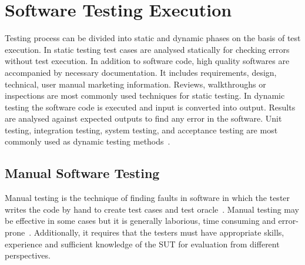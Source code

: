 \section{Software Testing Execution}
Testing process can be divided into static and dynamic phases on the basis of test execution. In static testing test cases are analysed statically for checking errors without test execution. In addition to software code, high quality softwares are accompanied by necessary documentation. It includes requirements, design, technical, user manual marketing information. Reviews, walkthroughs or inspections are most commonly used techniques for static testing. In dynamic testing the software code is executed and input is converted into output. Results are analysed against expected outputs to find any error in the software. Unit testing, integration testing, system testing, and acceptance testing are most commonly used as dynamic testing methods~\cite{fairley1978tutorial}.




\subsection{Manual Software Testing}
Manual testing is the technique of finding faults in software in which the tester writes the code by hand to create test cases and test oracle~\cite{Ciupa2008}. Manual testing may be effective in some cases but it is generally laborious, time consuming and error-prone~\cite{tretmans1999}. Additionally, it requires that the testers must have appropriate skills, experience and sufficient knowledge of the SUT for evaluation from different perspectives.
 
